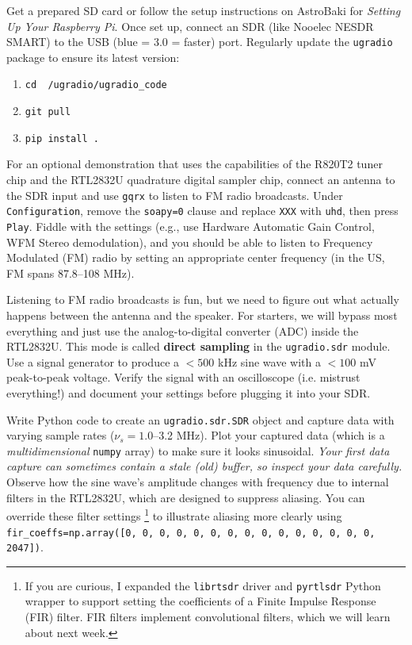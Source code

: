 \documentclass[11pt,preprint]{aastex}
\begin{document}
Get a prepared SD card or follow the setup instructions on AstroBaki for {\it Setting Up Your Raspberry Pi}. Once set up, connect an SDR (like Nooelec NESDR SMART) to the USB (blue = 3.0 = faster) port. Regularly update the {\tt ugradio} package to ensure its latest version:
\begin{enumerate}
    \item {\tt cd ~/ugradio/ugradio\_code}
    \item {\tt git pull}
    \item {\tt pip install .}
\end{enumerate}

For an optional demonstration that uses the capabilities of the R820T2 tuner chip and the RTL2832U quadrature digital sampler chip, connect an antenna to the SDR input and use {\tt gqrx} to listen to FM radio broadcasts. 
Under {\tt Configuration}, remove the {\tt soapy=0} clause and replace {\tt XXX} with {\tt uhd}, then press {\tt Play}. 
Fiddle with the settings (e.g., use Hardware Automatic Gain Control, WFM Stereo demodulation), and
you should be able to listen to Frequency Modulated (FM) 
radio by setting an appropriate center frequency (in the US, FM spans
87.8--108 MHz).

Listening to FM radio broadcasts is fun, but we need to figure out what actually happens between the antenna and the speaker.
For starters, we will bypass most everything and just use the analog-to-digital converter (ADC) inside the RTL2832U.
This mode is called {\bf direct sampling} in the {\tt ugradio.sdr} module.
Use a signal generator to produce a $<500$ kHz sine wave with a $<100$ mV peak-to-peak voltage.
Verify the signal with an oscilloscope (i.e. mistrust everything!) and document your settings before plugging it into your SDR.

Write Python code to create an {\tt ugradio.sdr.SDR} object and capture data with varying sample rates ($\nu_s = 1.0$--3.2 MHz).
Plot your captured data (which is a {\it multidimensional} {\tt numpy} array) to make sure it looks sinusoidal.
{\it Your first data capture can sometimes contain a stale (old) buffer, so inspect your data carefully.}
Observe how the sine wave's amplitude changes with frequency due to internal filters in the RTL2832U, which are designed to suppress aliasing.
You can override these filter settings
\footnote{If you are curious, 
I expanded the {\tt librtsdr} driver and {\tt pyrtlsdr} Python wrapper
to support setting the coefficients of a Finite Impulse Response
(FIR) filter. FIR filters implement convolutional filters, which we will
learn about next week.}
to illustrate aliasing more clearly using
{\tt fir\_coeffs=np.array([0, 0, 0, 0, 0, 0, 0, 0, 0, 0, 0, 0, 0, 0, 0, 2047])}.
\end{document}
